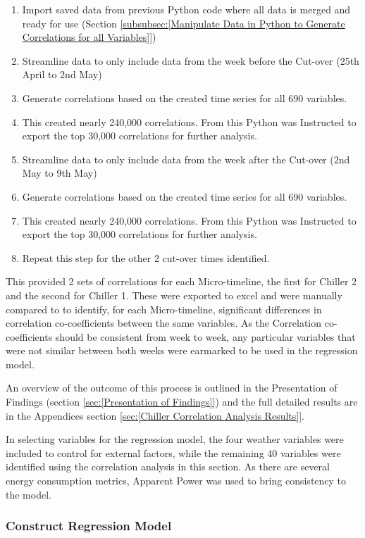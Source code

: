 \documentclass[12pt]{scrartcl}
\begin{document}
\begin{enumerate}
\item Import saved data from previous Python code where all data is merged and ready for use (Section \ref{subsubsec:[Manipulate Data in Python to Generate Correlations for all Variables]})
\item Streamline data to only include data from the week before the Cut-over (25th April to 2nd May)  
\item Generate correlations based on the created time series for all 690 variables.
\item This created nearly 240,000 correlations. From this Python was Instructed to export the top 30,000 correlations for further analysis.
\item Streamline data to only include data from the week after the Cut-over (2nd May to 9th May) 
\item Generate correlations based on the created time series for all 690 variables.
\item This created nearly 240,000 correlations. From this Python was Instructed to export the top 30,000 correlations for further analysis.
\item Repeat this step for the other 2 cut-over times identified.
\end{enumerate}  

This provided 2 sets of correlations for each Micro-timeline, the first for Chiller 2 and the second for Chiller 1. These were exported to excel and were manually compared to to identify, for each Micro-timeline, significant differences in correlation co-coefficients between the same variables. As the Correlation co-coefficients should be consistent from week to week, any particular variables that were not similar between both weeks were earmarked to be used in the regression model.

An overview of the outcome of this process is outlined in the Presentation of Findings (section \ref{sec:[Presentation of Findings]}) and the full detailed results are in the Appendices section \ref{sec:[Chiller Correlation Analysis Results]}. 

In selecting variables for the regression model, the four weather variables were included to control for external factors, while the remaining 40 variables were identified using the correlation analysis in this section. As there are several energy consumption metrics, Apparent Power was used to bring consistency to the model.       


\subsubsection{Construct Regression Model}
\label{subsubsec:[Construct Regression Model]}
\end{document}
